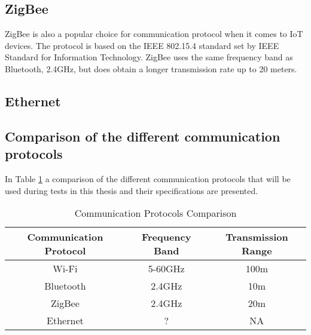 \subsection*{ZigBee}
ZigBee is also a popular choice for communication protocol when it comes to IoT devices. The protocol is based on the IEEE 802.15.4 standard set by IEEE Standard for Information Technology. \cite{ZigBeeStandard} ZigBee uses the same frequency band as Bluetooth, 2.4GHz, but does obtain a longer transmission rate up to 20 meters. \cite{IAQMonitorCommunicationReview} 

\subsection*{Ethernet}

\subsection*{Comparison of the different communication protocols}
In Table \ref{CommunicationProtocolsComparison} a comparison of the different communication protocols that will be used during tests in this thesis and their specifications are presented. \\
\begin{table}[!hbtp]
\begin{tabular}{||c | c | c ||} 
 \hline
 Communication Protocol & Frequency Band & Transmission Range  \\ [0.5ex]
 \hline\hline
 Wi-Fi & 5-60GHz & 100m \\ 
 Bluetooth & 2.4GHz & 10m \\
 ZigBee & 2.4GHz & 20m \\
 Ethernet & ? & NA \\ [1ex] 
 \hline
\end{tabular}
\caption{Communication Protocols Comparison}
\label{CommunicationProtocolsComparison}
\end{table}